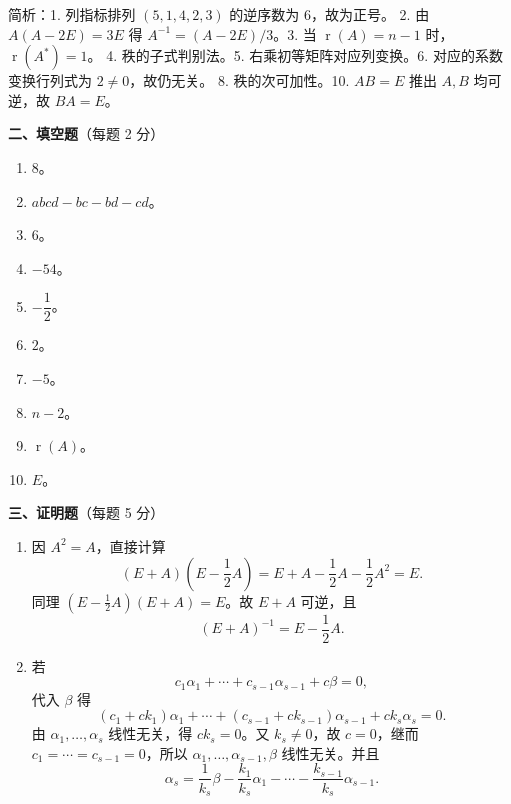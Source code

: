 \documentclass[12pt]{ctexart}
\newcommand{\rnk}{\operatorname{r}}
\begin{document}
\noindent\small 简析：1. 列指标排列 $(5,1,4,2,3)$ 的逆序数为 $6$，故为正号。
2. 由 $A(A-2E)=3E$ 得 $A^{-1}=(A-2E)/3$。3. 当 $\rnk(A)=n-1$ 时，$\rnk(A^{*})=1$。
4. 秩的子式判别法。5. 右乘初等矩阵对应列变换。6. 对应的系数变换行列式为 $2\neq0$，故仍无关。
8. 秩的次可加性。10. $AB=E$ 推出 $A,B$ 均可逆，故 $BA=E$。\normalsize

\vspace{8pt}
\noindent\textbf{二、填空题}（每题 2 分）
\begin{enumerate}[label=\arabic*.,itemsep=3pt]
\item $8$。
\item $abcd-bc-bd-cd$。
\item $6$。
\item $-54$。
\item $-\dfrac12$。
\item $2$。
\item $-5$。
\item $n-2$。
\item $\rnk(A)$。
\item $E$。
\end{enumerate}

\vspace{6pt}
\noindent\textbf{三、证明题}（每题 5 分）
\begin{enumerate}[label=\textbf{\arabic*.},itemsep=10pt]
\item 因 $A^2=A$，直接计算
  \[
  (E+A)\left(E-\frac12A\right)
  =E+A-\frac12A-\frac12A^2=E.
  \]
  同理 $\left(E-\frac12A\right)(E+A)=E$。故 $E+A$ 可逆，且
  \[
  (E+A)^{-1}=E-\frac12A.
  \]

\item 若
  \[
  c_1\alpha_1+\cdots+c_{s-1}\alpha_{s-1}+c\beta=0,
  \]
  代入 $\beta$ 得
  \[
  (c_1+ck_1)\alpha_1+\cdots+(c_{s-1}+ck_{s-1})\alpha_{s-1}
  +ck_s\alpha_s=0.
  \]
  由 $\alpha_1,\dots,\alpha_s$ 线性无关，得 $ck_s=0$。又 $k_s\neq0$，故 $c=0$，继而
  $c_1=\cdots=c_{s-1}=0$，所以 $\alpha_1,\dots,\alpha_{s-1},\beta$ 线性无关。并且
  \[
  \alpha_s=\frac1{k_s}\beta-\frac{k_1}{k_s}\alpha_1-\cdots-\frac{k_{s-1}}{k_s}\alpha_{s-1}.
  \]
\end{enumerate}
\end{document}
